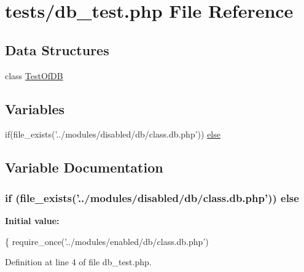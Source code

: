 \hypertarget{db__test_8php}{\section{tests/db\-\_\-test.php File Reference}
\label{db__test_8php}
}
\subsection*{Data Structures}
\begin{DoxyCompactItemize}
\item 
class \hyperlink{class_test_of_d_b}{Test\-Of\-D\-B}
\end{DoxyCompactItemize}
\subsection*{Variables}
\begin{DoxyCompactItemize}
\item 
if(file\-\_\-exists('../modules/disabled/db/class.\-db.\-php')) \hyperlink{db__test_8php_ad7f9cc84547b9e3f178628a43bbb15ef}{else}
\end{DoxyCompactItemize}


\subsection{Variable Documentation}
\hypertarget{db__test_8php_ad7f9cc84547b9e3f178628a43bbb15ef}{
\subsubsection[{else}]{\setlength{\rightskip}{0pt plus 5cm}if (file\-\_\-exists('../modules/disabled/db/class.\-db.\-php')) else}}\label{db__test_8php_ad7f9cc84547b9e3f178628a43bbb15ef}
{\bfseries Initial value\-:}
\begin{DoxyCode}
\{
        require\_once(\textcolor{stringliteral}{'../modules/enabled/db/class.db.php'})
\end{DoxyCode}


Definition at line 4 of file db\-\_\-test.\-php.

